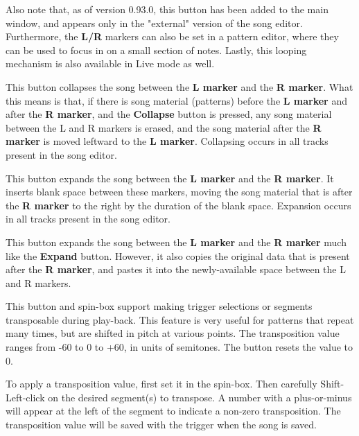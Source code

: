    Also note that, as of version 0.93.0, this button has been added to the main
   window, and appears only in the "external" version of the song editor.
   Furthermore, the \textbf{L/R} markers can also be set in a pattern editor,
   where they can be used to focus in on a small section of notes.
   Lastly, this looping mechanism is also available in Live mode as well.

   This button collapses the song between the \textbf{L marker} and the
   \textbf{R marker}.
   What this means is that, if there is song material (patterns) before the
   \textbf{L marker} and after the \textbf{R marker},
   and the \textbf{Collapse} button is
   pressed, any song material between the L and R markers is erased, and
   the song material after the \textbf{R marker} is moved leftward to
   the \textbf{L marker}.
   Collapsing occurs in all tracks present in the song editor.

   This button expands the song between the
   \textbf{L marker} and the \textbf{R marker}.
   It inserts blank space between these markers, moving the song material
   that is after the \textbf{R marker}
   to the right by the duration of the blank space.
   Expansion occurs in all tracks present in the song editor.

   This button expands the song between the \textbf{L marker} and the
   \textbf{R marker} much like the \textbf{Expand} button.
   However, it also copies the original data that is present after the
   \textbf{R marker}, and pastes it into the newly-available space between
   the L and R markers.

   This button and spin-box support making trigger selections or segments
   transposable during play-back.  This feature is very useful
   for patterns that repeat many times, but are shifted in pitch at various
   points.
   The transposition value ranges from -60 to 0 to +60, in units of semitones.
   The button resets the value to 0.

   To apply a transposition value, first set it in the spin-box.
   Then carefully Shift-Left-click on the desired segment(s) to transpose.
   A number with a plus-or-minus will appear at the left of the segment to
   indicate a non-zero transposition.
   The transposition value will be saved with the trigger when the song is
   saved.

